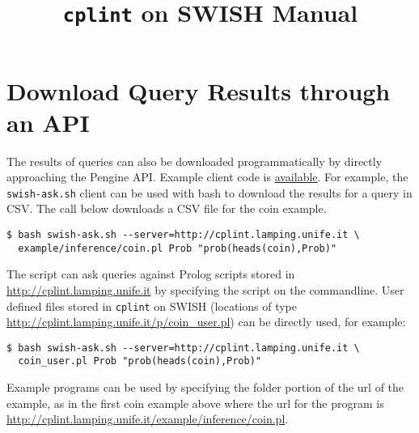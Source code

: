 \documentclass[a4paper,10pt]{scrartcl}
\begin{document}
\title{\texttt{cplint} on SWISH Manual}
\maketitle

%

















\section{Download Query Results through an API}
The results of queries can also be downloaded programmatically by directly
approaching the Pengine API. Example client code is 
\href{https://github.com/friguzzi/swish/tree/master/client}{available}.  For example, the \verb|swish-ask.sh| client
can be used with bash to download the results for a query in CSV.  The call
below downloads a CSV file for the coin example.
\begin{verbatim}
$ bash swish-ask.sh --server=http://cplint.lamping.unife.it \   
  example/inference/coin.pl Prob "prob(heads(coin),Prob)"
\end{verbatim}
The script can ask queries against Prolog scripts stored in 
\url{http://cplint.lamping.unife.it} by specifying
the script on the commandline.  User defined files stored
in \texttt{cplint} on SWISH (locations of type
\url{http://cplint.lamping.unife.it/p/coin_user.pl}) can
be directly used, for example:
\begin{verbatim}
$ bash swish-ask.sh --server=http://cplint.lamping.unife.it \
  coin_user.pl Prob "prob(heads(coin),Prob)"
\end{verbatim}
Example programs can be used by specifying the folder portion of the url of the example,
as in the first coin example above where the url for the program is 
\url{http://cplint.lamping.unife.it/example/inference/coin.pl}.
\end{document}
